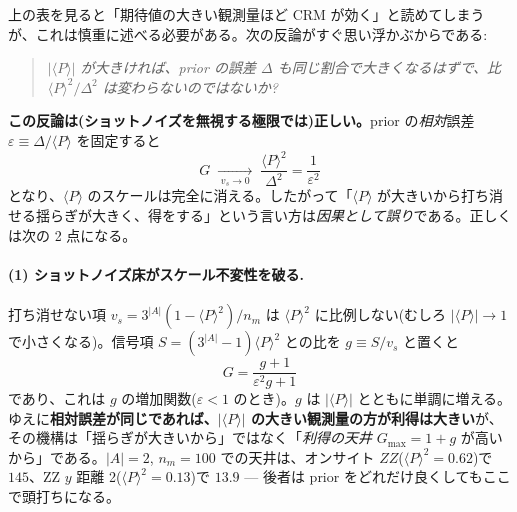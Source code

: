 \documentclass[11pt,a4paper]{ltjsarticle}
\newcommand{\ev}[1]{\langle #1\rangle}
\begin{document}
上の表を見ると「期待値の大きい観測量ほど CRM が効く」と読めてしまうが、これは慎重に述べる必要がある。次の反論がすぐ思い浮かぶからである:
\begin{quote}
\emph{$|\ev{P}|$ が大きければ、prior の誤差 $\Delta$ も同じ割合で大きくなるはずで、比 $\ev{P}^2/\Delta^2$ は変わらないのではないか?}
\end{quote}
\textbf{この反論は(ショットノイズを無視する極限では)正しい。}prior の\emph{相対}誤差 $\varepsilon\equiv\Delta/\ev{P}$ を固定すると
\begin{equation}
  G \;\xrightarrow[\;v_s\to0\;]{}\; \frac{\ev{P}^2}{\Delta^2} = \frac{1}{\varepsilon^2}
\end{equation}
となり、$\ev{P}$ のスケールは完全に消える。したがって「$\ev{P}$ が大きいから打ち消せる揺らぎが大きく、得をする」という言い方は\emph{因果として誤り}である。正しくは次の 2 点になる。

\paragraph{(1) ショットノイズ床がスケール不変性を破る.}打ち消せない項 $v_s=3^{|A|}(1-\ev{P}^2)/n_m$ は $\ev{P}^2$ に比例しない(むしろ $|\ev{P}|\to1$ で小さくなる)。信号項 $S=(3^{|A|}-1)\ev{P}^2$ との比を $g\equiv S/v_s$ と置くと
\begin{equation}
  G = \frac{g+1}{\varepsilon^2 g+1}
\end{equation}
であり、これは $g$ の増加関数($\varepsilon<1$ のとき)。$g$ は $|\ev{P}|$ とともに単調に増える。ゆえに\textbf{相対誤差が同じであれば、$|\ev{P}|$ の大きい観測量の方が利得は大きい}が、その機構は「揺らぎが大きいから」ではなく「\emph{利得の天井} $G_{\max}=1+g$ が高いから」である。$|A|=2$, $n_m=100$ での天井は、オンサイト $ZZ$($\ev{P}^2=0.62$)で $145$、ZZ $y$ 距離 2($\ev{P}^2=0.13$)で $13.9$ — 後者は prior をどれだけ良くしてもここで頭打ちになる。
\end{document}
